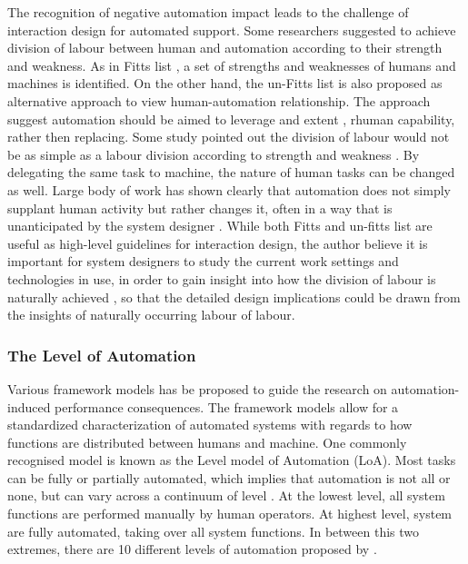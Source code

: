 The recognition of negative automation impact leads to the challenge of interaction design for automated support.  Some researchers suggested to achieve division of labour between human and automation according to their strength and weakness. As in Fitts list \cite{Fitts} , a set of strengths and weaknesses of humans and machines is identified. On the other hand, the un-Fitts list \cite{Hoffman2002} is also proposed as alternative approach to view human-automation relationship. The approach suggest automation should be aimed to leverage and extent , rhuman capability, rather then replacing. Some study pointed out the division of labour would not be as simple as a labour division according to strength and weakness \cite{Bradshaw2011}. By delegating the same task to machine, the nature of human tasks can be changed as well. Large body of work has shown clearly that automation does not simply supplant human activity but rather changes it, often in a way that is unanticipated by the system designer \cite{Bradshaw2011}. While both Fitts and un-fitts list are useful as high-level guidelines for interaction design, the author believe it is important for system designers to study the current work settings and technologies in use, in order to gain insight into how the division of labour is naturally achieved \cite{Crabtree2012}, so that the detailed design implications could be drawn from the insights of naturally occurring labour of labour. \\


\subsubsection{The Level of Automation}\label{sec:lrloa}
Various framework models has be proposed to guide the research on automation-induced performance consequences. The framework models allow for a standardized characterization of automated systems with regards to how functions are distributed between humans and machine. One commonly recognised model is known as the Level model of Automation (LoA). Most tasks can be fully or partially automated, which implies that automation is not all or none, but can vary across a continuum of level \cite{Wickens2010}. At the lowest level, all system functions are performed manually by human operators.  At highest level, system are fully automated, taking over all system functions. In between this two extremes, there are 10 different levels of automation proposed by \cite{Wickens2010}. \\

